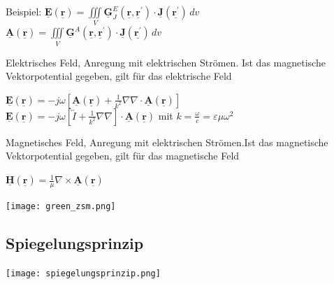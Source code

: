 \documentclass[english]{latex4ei/latex4ei_sheet}
\renewcommand{\vec}[1]{\underline{\boldsymbol{#1}}}
\begin{document}
\begin{sectionbox}
	Beispiel: $\vec{E}\left(\vec{r}\right) = \iiint\limits_{V}\vec{G}_{J}^{E}\left(\vec{r}, \vec{r}^{\prime}\right) \cdot \vec{J}\left(\vec{r^{\prime}}\right)\,dv $\\
	$\vec{A}\left(\vec{r}\right) = \iiint\limits_{V}\vec{G}^{A}\left(\vec{r}, \vec{r}^{\prime}\right) \cdot \vec{J}\left(\vec{r^{\prime}}\right)\,dv $

	Elektrisches Feld, Anregung mit elektrischen Strömen. Ist das magnetische Vektorpotential gegeben, gilt für das elektrische Feld\\
	\begin{emphbox}
		$\vec{E}(\vec{r})=-j \omega\left[\vec{A}(\vec{r})+\frac{1}{k^{2}} \nabla \nabla \cdot \vec{A}(\vec{r})\right]$\\
		$\vec{E}(\vec{r})=-j \omega\left[\overleftrightarrow{I}+\frac{1}{k^{2}} \nabla \nabla\right] \cdot \vec{A}(\vec{r})$		
		mit $k=\frac{\omega}{c}=\varepsilon\mu\omega^2$\\
	\end{emphbox}
	Magnetisches Feld, Anregung mit elektrischen Strömen.Ist das magnetische Vektorpotential gegeben, gilt für das magnetische Feld\\
	\begin{emphbox}
		$\vec{H}(\vec{r})=\frac{1}{\mu} \nabla \times \vec{A}(\vec{r})$\\
	\end{emphbox}
	\begin{center}\texttt{[image: green\_zsm.png]}\end{center}
\end{sectionbox}

\begin{sectionbox}
	\subsection{Spiegelungsprinzip}
	\begin{center}\texttt{[image: spiegelungsprinzip.png]}\end{center}
\end{sectionbox}
\end{document}
